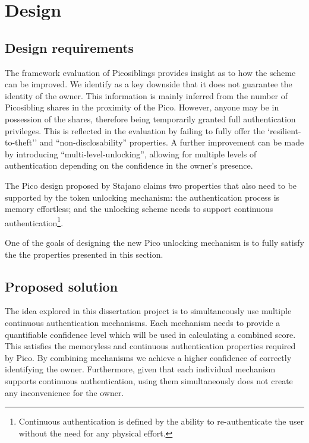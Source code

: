 
\chapter{Design} %

\label{Chapter3} %


\section{Design requirements}
The framework evaluation of Picosiblings provides insight as to how the scheme can be improved. We identify as a key downside that it does not guarantee the identity of the owner. This information is mainly inferred from the number of Picosibling shares in the proximity of the Pico. However, anyone may be in possession of the shares, therefore being temporarily granted full authentication privileges. This is reflected in the evaluation by failing to fully offer the `resilient-to-theft'' and ``non-disclosability'' properties. A further improvement can be made by introducing ``multi-level-unlocking'', allowing for multiple levels of authentication depending on the confidence in the owner's presence.

The Pico design proposed by Stajano \cite{stajano2011pico} claims two properties that also need to be supported by the token unlocking mechanism: the authentication process is memory effortless; and the unlocking scheme needs to support continuous authentication\footnote{Continuous authentication is defined by the ability to re-authenticate the user without the need for any physical effort.}. 

One of the goals of designing the new Pico unlocking mechanism is to fully satisfy the the properties presented in this section.

\section{Proposed solution}
\label{propopsedsol}
The idea explored in this dissertation project is to simultaneously use multiple continuous authentication mechanisms. Each mechanism needs to provide a quantifiable confidence level which will be used in calculating a combined score. This satisfies the memoryless and continuous authentication properties required by Pico. By combining mechanisms we achieve a higher confidence of correctly identifying the owner. Furthermore, given that each individual mechanism supports continuous authentication, using them simultaneously does not create any inconvenience for the owner.

